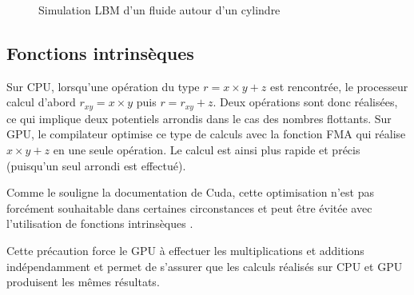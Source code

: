 \begin{figure}[h]
{		\label{fig:lbm_42000}
	}
	\caption{Simulation \ac{LBM} d'un fluide autour d'un cylindre}
	\label{fig:lbm_5000_to_43000}
\end{figure}

\subsection{Fonctions intrinsèques}
Sur \ac{CPU}, lorsqu'une opération du type $r = x \times y+z$ est rencontrée, le processeur calcul d'abord $r_{xy} = x \times y$ puis $r = r_{xy} + z$. Deux opérations sont donc réalisées, ce qui implique deux potentiels arrondis dans le cas des nombres flottants. Sur \ac{GPU}, le compilateur optimise ce type de calculs \cite{Cuda_IEEE754_Ctrl_FMA} avec la fonction \ac{FMA} qui réalise $x \times y+z$ en une seule opération. Le calcul est ainsi plus rapide et précis (puisqu'un seul arrondi est effectué).

Comme le souligne la documentation de Cuda, cette optimisation n'est pas forcément souhaitable dans certaines circonstances et peut être évitée avec l'utilisation de fonctions intrinsèques \cite{Cuda_IEEE754_Ctrl_FMA, Cuda_INTRINSIC_DOUBLE}.

Cette précaution force le \ac{GPU} à effectuer les multiplications et additions indépendamment et permet de s’assurer que les calculs réalisés sur \ac{CPU} et \ac{GPU} produisent les mêmes résultats.
